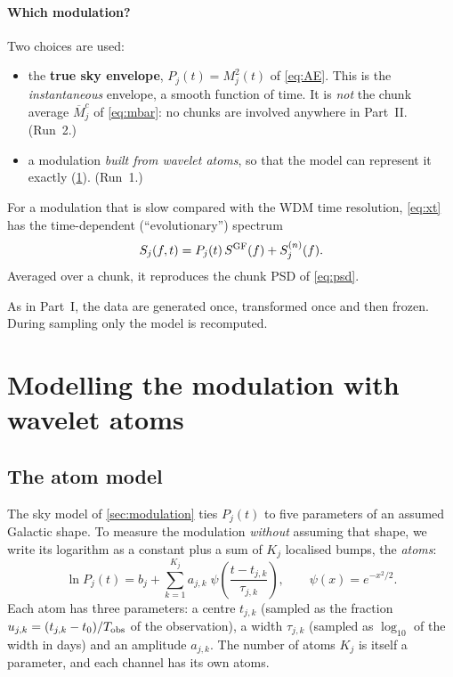 \documentclass[11pt,a4paper]{article}
\newcommand{\Mbar}{\overline{M}}
\begin{document}
\paragraph{Which modulation?} Two choices are used:
\begin{itemize}
  \item the \textbf{true sky envelope}, $P_j(t) = M_j^2(t)$ of \cref{eq:AE}. This is
        the \emph{instantaneous} envelope, a smooth function of time. It is
        \emph{not} the chunk average $\Mbar^c_j$ of \cref{eq:mbar}: no chunks are
        involved anywhere in Part~II. (Run~2.)
  \item a modulation \emph{built from wavelet atoms}, so that the model can represent
        it exactly (\cref{sec:atoms}). (Run~1.)
\end{itemize}
For a modulation that is slow compared with the WDM time resolution, \cref{eq:xt}
has the time-dependent (``evolutionary'') spectrum
\begin{equation}
  S_j(f,t) = P_j(t)\,S^{\rm GF}(f) + S^{(n)}_j(f).
  \label{eq:sft}
\end{equation}
Averaged over a chunk, it reproduces the chunk PSD of \cref{eq:psd}.

As in Part~I, the data are generated once, transformed once and then frozen. During
sampling only the model is recomputed.

\section{Modelling the modulation with wavelet atoms}\label{sec:atoms}

\subsection{The atom model}

The sky model of \cref{sec:modulation} ties $P_j(t)$ to five parameters of an assumed
Galactic shape. To measure the modulation \emph{without} assuming that shape, we write
its logarithm as a constant plus a sum of $K_j$ localised bumps, the \emph{atoms}:
\begin{equation}
  \ln P_j(t) = b_j + \sum_{k=1}^{K_j} a_{j,k}\;
  \psi\!\left(\frac{t-t_{j,k}}{\tau_{j,k}}\right),
  \qquad
  \psi(x) = e^{-x^2/2}.
  \label{eq:atoms}
\end{equation}
Each atom has three parameters: a centre $t_{j,k}$ (sampled as the fraction
$u_{j,k}=(t_{j,k}-t_0)/T_{\rm obs}$ of the observation), a width $\tau_{j,k}$ (sampled
as $\log_{10}$ of the width in days) and an amplitude $a_{j,k}$. The number of atoms
$K_j$ is itself a parameter, and each channel has its own atoms.
\end{document}
